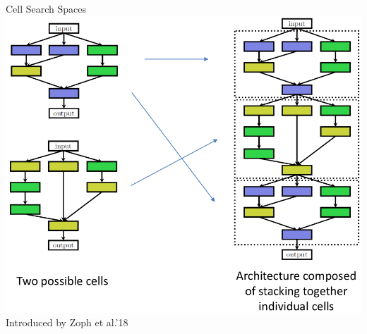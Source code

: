 \begin{frame}[c]{Cell Search Spaces}
\centering
\includegraphics[height=.8\textheight]{images_lec7/s26}\\
Introduced by Zoph et al.’18
\end{frame}
